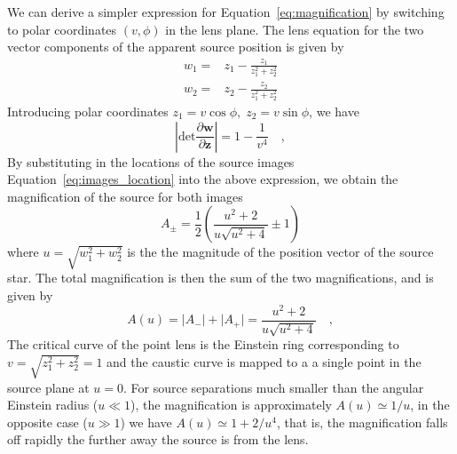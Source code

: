 \documentclass[12pt,dvipsnames]{report}
\begin{document}
We can derive a simpler expression for Equation~\ref{eq:magnification} by
switching to polar coordinates $(v,\phi)$ in the lens plane. The lens equation
for the two vector components of the apparent source position is given by
\begin{align}
    w_1= & z_1- \frac{z_1}{z_1^2+z_2^2} \\
    w_2= & z_2- \frac{z_2}{z_1^2+z_2^2}
\end{align}
Introducing polar coordinates $z_1=v\cos\phi,\;z_2=v\sin\phi$, we have
\begin{equation}
    \left\lvert\textrm{det}
    \frac{\partial \mathbf w}{\partial \mathbf z} \right\rvert =1- \frac{1}{v^4}\quad,
\end{equation}
By substituting in the locations of the source images
Equation~\ref{eq:images_location} into the
above expression, we obtain the magnification of the source for both images
\begin{equation}
    A_\pm = \frac{1}{2}\left(\frac{u^{2}+2}{u \sqrt{u^{2}+4}} \pm 1\right)
    \label{eq:magnification_per_image}
\end{equation}
where $u = \sqrt{w_1^2+w_2^2}$ is the the magnitude of the position
vector of the source star.
The total magnification is then the sum of the two magnifications, and is given by
\citep{1936Sci....84..506E}
\begin{equation}
    A(u)=\lvert A_-\rvert+\lvert A_+\rvert= \frac{u^2+2}{u\sqrt{u^2+4}}\quad,
    \label{eq:magnification_point_lens}
\end{equation}
The critical curve of the point lens is the Einstein
ring corresponding to $v=\sqrt{z_1^2+z_2^2}=1$ and the caustic curve is mapped to a
a single point in the source plane at $u=0$.
For source separations much smaller than the angular Einstein radius ($u\ll 1$), the
magnification is approximately $A(u)\simeq 1/u$, in the opposite case ($u\gg 1$)
we have $A(u)\simeq 1+ 2/u^4$, that is, the magnification falls off rapidly the further
away the source is from the lens.
\end{document}
